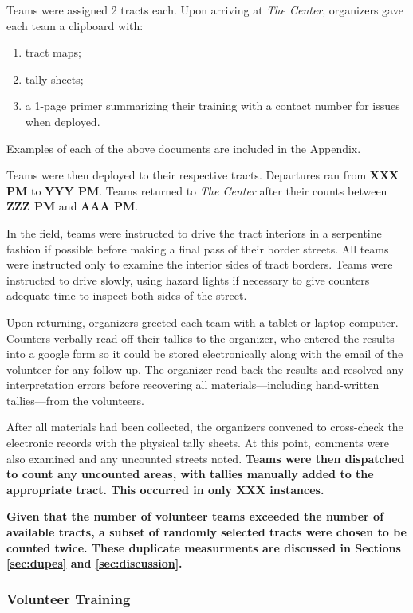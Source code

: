 \documentclass[11pt,twocolumn]{article}
\def\bfr{\bf\color{red}}
\begin{document}
Teams were assigned 2 tracts each. Upon arriving at {\it The Center}, organizers 
gave each team a clipboard with:
\begin{enumerate}
	\item tract maps;
	\item tally sheets;
	\item a 1-page primer summarizing their training with a contact number for issues when deployed.
\end{enumerate}
Examples of each of the above documents are included in the Appendix.

Teams were then deployed to their respective tracts. Departures ran from {\bfr XXX PM} 
to {\bfr YYY PM}. Teams returned to {\it The Center} after their counts between {\bfr ZZZ PM} and 
{\bfr AAA PM}.

In the field, teams were instructed to drive the tract interiors in a serpentine fashion if possible before
making a final pass of their border streets. All teams were instructed only to examine the interior sides
of tract borders. Teams were instructed to drive slowly, using hazard lights if necessary to give counters
adequate time to inspect both sides of the street.

Upon returning, organizers greeted each team with a tablet or laptop computer. Counters verbally 
read-off their tallies to the organizer, who entered the results into a google
form so it could be stored electronically along with the email of the volunteer for any follow-up. The 
organizer read back the results and resolved any interpretation errors before recovering all 
materials---including hand-written tallies---from the volunteers.

After all materials had been collected, the organizers convened to cross-check the electronic records
with the physical tally sheets. At this point, comments were also examined and any uncounted streets
noted. {\bfr Teams were then dispatched to count any uncounted areas, with tallies manually added
to the appropriate tract. This occurred in only XXX instances.} 

{\bfr Given that the number of volunteer teams exceeded the number of available tracts, a
subset of randomly selected tracts were chosen to be counted twice. These duplicate measurments are 
discussed in Sections \ref{sec:dupes} and \ref{sec:discussion}.}

\subsubsection{Volunteer Training}
\end{document}
